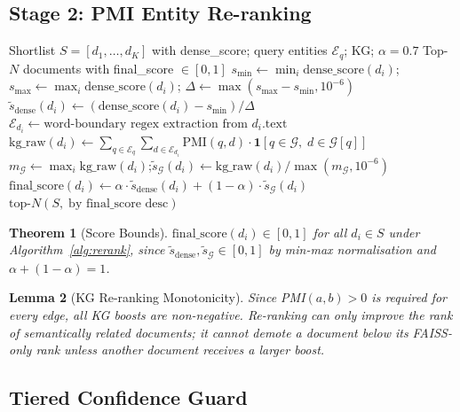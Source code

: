 \documentclass[12pt,a4paper]{article}
\theoremstyle{definition}
\theoremstyle{plain}
\newtheorem{theorem}{Theorem}[section]
\newtheorem{lemma}[theorem]{Lemma}
\theoremstyle{remark}
\newcommand{\KG}{\mathcal{G}}
\begin{document}
\subsection{Stage 2: PMI Entity Re-ranking}

\begin{algorithm}[H]
\caption{NER KG Re-ranker (Full Algorithm)}
\label{alg:rerank}
\begin{algorithmic}[1]
\Require Shortlist $S = [d_1,\ldots,d_K]$ with dense\_score; query entities $\mathcal{E}_q$; KG; $\alpha = 0.7$
\Ensure Top-$N$ documents with final\_score $\in [0,1]$
\State $s_{\min} \gets \min_i \text{dense\_score}(d_i)$;\; $s_{\max} \gets \max_i \text{dense\_score}(d_i)$;\; $\Delta \gets \max(s_{\max}-s_{\min}, 10^{-6})$
\State $\tilde{s}_{\text{dense}}(d_i) \gets (\text{dense\_score}(d_i) - s_{\min}) / \Delta$
  \State $\mathcal{E}_{d_i} \gets \text{word-boundary regex extraction from } d_i.\text{text}$
  \State $\text{kg\_raw}(d_i) \gets \sum_{q \in \mathcal{E}_q}\sum_{d \in \mathcal{E}_{d_i}} \text{PMI}(q,d) \cdot \mathbf{1}[q \in \KG,\; d \in \KG[q]]$
\EndFor
\State $m_{\KG} \gets \max_i \text{kg\_raw}(d_i)$;\quad $\tilde{s}_{\KG}(d_i) \gets \text{kg\_raw}(d_i) / \max(m_{\KG}, 10^{-6})$
  \State $\text{final\_score}(d_i) \gets \alpha \cdot \tilde{s}_{\text{dense}}(d_i) + (1-\alpha)\cdot\tilde{s}_{\KG}(d_i)$
\EndFor
\State \Return $\text{top-}N(S,\; \text{by final\_score desc})$
\end{algorithmic}
\end{algorithm}

\begin{theorem}[Score Bounds]
$\text{final\_score}(d_i) \in [0,1]$ for all $d_i \in S$ under Algorithm~\ref{alg:rerank}, since $\tilde{s}_{\text{dense}}, \tilde{s}_{\KG} \in [0,1]$ by min-max normalisation and $\alpha + (1-\alpha) = 1$.
\end{theorem}

\begin{lemma}[KG Re-ranking Monotonicity]
Since PMI$(a,b) > 0$ is required for every edge, all KG boosts are non-negative. Re-ranking can only improve the rank of semantically related documents; it cannot demote a document below its FAISS-only rank unless another document receives a larger boost.
\end{lemma}

\subsection{Tiered Confidence Guard}
\end{document}
